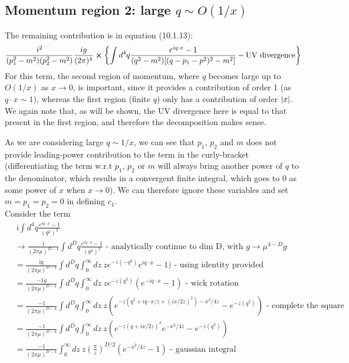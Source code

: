 \documentclass{article}
\begin{document}
\subsection{Momentum region 2: large $q \sim O(1/x)$}\label{large q}
The remaining contribution is in equation (10.1.13):
\begin{equation} \label{eq:div_eg_large_q}
    \frac{i^2}{(p_1^2-m^2)(p_2^2-m^2)}\frac{ig}{(2\pi)^4}\cross\qty{\int d^4q \frac{e^{iq\cdot x}-1}{(q^2-m^2)[(q-p_1-p^2)^2-m^2]}-\text{UV divergence}}
\end{equation}
For this term, the second region of momentum, where $q$ becomes large up to $O(1/x)$ as $x \rightarrow 0$, is important, since it provides a contribution of order 1 (as $q\cdot x \sim 1$), whereas the first region (finite $q$) only has a contribution of order $\abs{x}$. We again note that, as will be shown, the UV divergence here is equal to that present in the first region, and therefore the decomposition makes sense. 

As we are considering large $q \sim 1/x$, we can see that $p_1$, $p_2$ and $m$ does not provide leading-power contribution to the term in the curly-bracket (differentiating the term w.r.t $p_1$, $p_2$ or $m$ will always bring another power of $q$ to the denominator, which results in a convergent finite integral, which goes to $0$ as some power of $x$ when $x \rightarrow 0$). We can therefore ignore these variables and set $m=p_1=p_2=0$ in defining $c_1$. \\

Consider the term
\begin{equation}
\begin{split}
    &\ \text{i}\int d^4q\frac{e^{iq\cdot x}-1}{(q^2)^2} \\
    &\rightarrow\frac{\text{i}}{(2\pi\mu)^{D-4}}\int d^Dq\frac{e^{iq\cdot x}-1}{(q^2)^2} \text{ - analytically continue to dim D, with } g \rightarrow \mu^{4-D}g\\
    &= \frac{\text{ig}}{(2\pi\mu)^{D-4}}\int d^Dq \int_0^\infty  dz\ z e^{-z(-q^2)} e^{iq\cdot x}-1) \text{ - using identity provided}\\
    &= \frac{-1g}{(2\pi\mu)^{D-4}}\int d^Dq \int_0^\infty  dz\ z e^{-z(q^2)} (e^{-iq\cdot x}-1) \text{ - wick rotation}\\
    &= \frac{-1}{(2\pi\mu)^{D-4}}\int d^Dq \int_0^\infty  dz\ z (e^{-z(q^2+iq\cdot x/z+(ix/2z)^2)-x^2/4z}-e^{-z(q^2)}) \text{ - complete the square}\\
    &= \frac{-1}{(2\pi\mu)^{D-4}}\int d^Dq \int_0^\infty  dz\ z (e^{-z(q+ix/2z)^2}e^{-x^2/4z}-e^{-z(q^2)})\\
    &= \frac{-1}{(2\pi\mu)^{D-4}}\int_0^\infty  dz\ z (\frac{\pi}{z})^{D/2}(e^{-x^2/4z}-1)\text{ - gaussian integral}\\
\end{split}
\end{equation}
\end{document}
